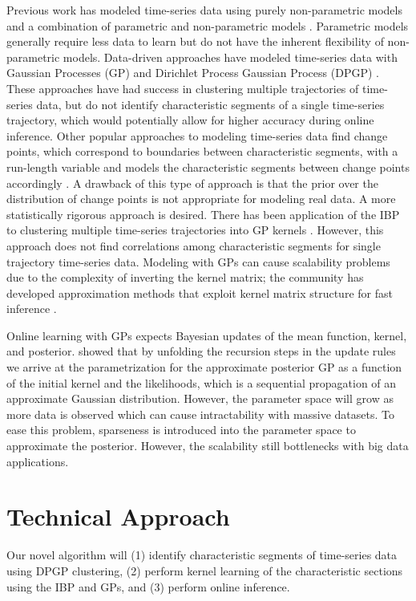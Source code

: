 \documentclass{article}
\begin{document}
Previous work has modeled time-series data using purely non-parametric models \cite{FastNonP} and a combination of parametric and non-parametric models \cite{StructDiscNonPara}. Parametric models generally require less data to learn but do not have the inherent flexibility of non-parametric models. Data-driven approaches have modeled time-series data with Gaussian Processes (GP) and Dirichlet Process Gaussian Process (DPGP) \cite{DPGPwithConstraints}. These approaches have had success in clustering multiple trajectories of time-series data, but do not identify characteristic segments of a single time-series trajectory, which would potentially allow for higher accuracy during online inference. Other popular approaches to modeling time-series data find change points, which correspond to boundaries between characteristic segments, with a run-length variable and models the characteristic segments between change points accordingly \cite{GPChangePointModels}. A drawback of this type of approach is that the prior over the distribution of change points is not appropriate for modeling real data. A more statistically rigorous approach is desired. There has been application of the IBP to clustering multiple time-series trajectories into GP kernels \cite{IBPGP}. However, this approach does not find correlations among characteristic segments for single trajectory time-series data. Modeling with GPs can cause scalability problems due to the complexity of inverting the kernel matrix; the community has developed approximation methods that exploit kernel matrix structure for fast inference \cite{KISS-GP}.

Online learning with GPs expects Bayesian updates of the mean function, kernel, and posterior. \cite{SparseGPOnline} showed that by unfolding the recursion steps in the update rules we arrive at the parametrization for the approximate posterior GP as a function of the initial kernel and the likelihoods, which is a sequential propagation of an approximate Gaussian distribution. However, the parameter space will grow as more data is observed which can cause intractability with massive datasets. To ease this problem, sparseness is introduced into the parameter space to approximate the posterior. However, the scalability still bottlenecks with big data applications.   

\section{Technical Approach}
Our novel algorithm will (1) identify characteristic segments of time-series data using DPGP clustering, (2) perform kernel learning of the characteristic sections using the IBP and GPs, and (3) perform online inference.
\end{document}
